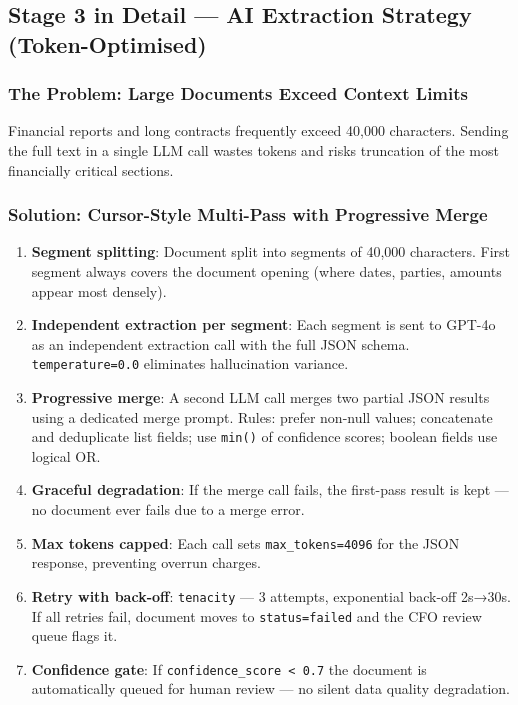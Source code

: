 \documentclass[12pt,a4paper]{article}
\newcommand{\codeinline}[1]{\texttt{\small\color{NordicBlue}#1}}
\begin{document}
\subsection{Stage 3 in Detail — AI Extraction Strategy (Token-Optimised)}

\subsubsection{The Problem: Large Documents Exceed Context Limits}

Financial reports and long contracts frequently exceed 40,000 characters. Sending the full text in a single LLM call wastes tokens and risks truncation of the most financially critical sections.

\subsubsection{Solution: Cursor-Style Multi-Pass with Progressive Merge}

\begin{tcolorbox}[colback=LightBg, colframe=NordicAccent, boxrule=1pt, arc=4pt,
  title={\small\textbf{Token Optimisation Strategy — Implemented in \codeinline{llm\_extractor.py}}}]
\begin{enumerate}[leftmargin=*, itemsep=2pt]
  \item \textbf{Segment splitting}: Document split into segments of 40,000 characters. First segment always covers the document opening (where dates, parties, amounts appear most densely).
  \item \textbf{Independent extraction per segment}: Each segment is sent to GPT-4o as an independent extraction call with the full JSON schema. \codeinline{temperature=0.0} eliminates hallucination variance.
  \item \textbf{Progressive merge}: A second LLM call merges two partial JSON results using a dedicated merge prompt. Rules: prefer non-null values; concatenate and deduplicate list fields; use \texttt{min()} of confidence scores; boolean fields use logical OR.
  \item \textbf{Graceful degradation}: If the merge call fails, the first-pass result is kept — no document ever fails due to a merge error.
  \item \textbf{Max tokens capped}: Each call sets \codeinline{max\_tokens=4096} for the JSON response, preventing overrun charges.
  \item \textbf{Retry with back-off}: \codeinline{tenacity} — 3 attempts, exponential back-off 2s→30s. If all retries fail, document moves to \codeinline{status=failed} and the CFO review queue flags it.
  \item \textbf{Confidence gate}: If \codeinline{confidence\_score < 0.7} the document is automatically queued for human review — no silent data quality degradation.
\end{enumerate}
\end{tcolorbox}
\end{document}
